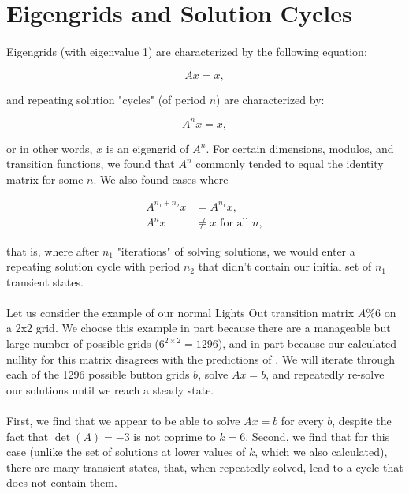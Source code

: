 \documentclass[11pt]{article}
\begin{document}
\section*{Eigengrids and Solution Cycles}

\paragraph{} Eigengrids (with eigenvalue 1) are characterized by the following equation:

\begin{equation}
Ax = x,
\end{equation}

\noindent and repeating solution "cycles" (of period $n$) are characterized by:

\begin{equation}
A^nx = x,
\end{equation}

\noindent or in other words, $x$ is an eigengrid of $A^n$. For certain dimensions, modulos, and transition functions, we found that $A^n$ commonly tended to equal the identity matrix for some $n$. We also found cases where

\begin{equation}
\begin{split}
  A^{n_1 + n_2}x & = A^{n_1}x,\\
  A^{n}x & \neq x \text{ for all } n,
\end{split}
\end{equation}

\noindent that is, where after $n_1$ "iterations" of solving solutions, we would enter a repeating solution cycle with period $n_2$ that didn't contain our initial set of $n_1$ transient states.

\paragraph{} Let us consider the example of our normal Lights Out transition matrix $A \% 6$ on a 2x2 grid. We choose this example in part because there are a manageable but large number of possible grids ($6^{2 \times 2} = 1296$), and in part because our calculated nullity for this matrix disagrees with the predictions of \cite{involve}. We will iterate through each of the 1296 possible button grids $b$, solve $Ax=b$, and repeatedly re-solve our solutions until we reach a steady state.

\paragraph{} First, we find that we appear to be able to solve $Ax=b$ for every $b$, despite the fact that $\det(A) = -3$ is not coprime to $k=6$. Second, we find that for this case (unlike the set of solutions at lower values of $k$, which we also calculated), there are many transient states, that, when repeatedly solved, lead to a cycle that does not contain them.
\end{document}
